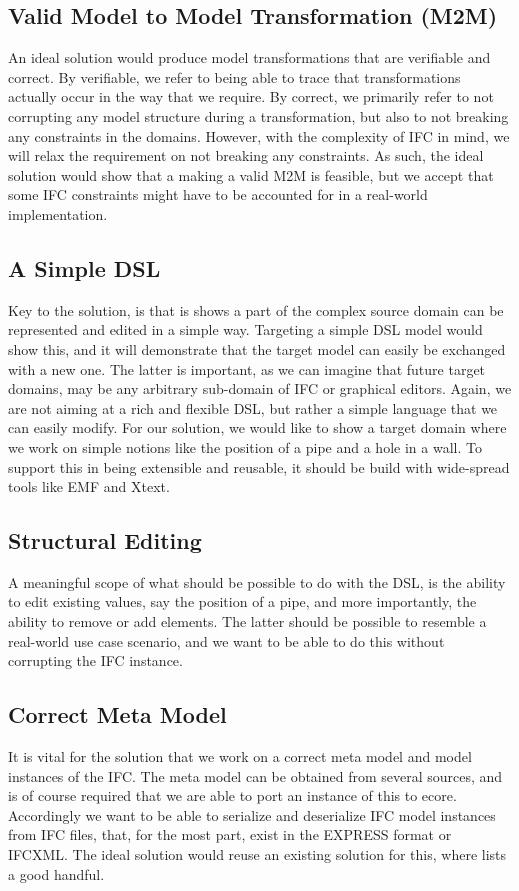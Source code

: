 \subsection{Valid Model to Model Transformation (M2M)}
An ideal solution would produce model transformations that are verifiable and correct. By verifiable, we refer to being able to trace that transformations actually occur in the way that we require. By correct, we primarily refer to not corrupting any model structure during a transformation, but also to not breaking any constraints in the domains. However, with the complexity of IFC in mind, we will relax the requirement on not breaking any constraints. As such, the ideal solution would show that a making a valid M2M is feasible, but we accept that some IFC constraints might have to be accounted for in a real-world implementation.

\subsection{A Simple DSL}
Key to the solution, is that is shows a part of the complex source domain can be represented and edited in a simple way. Targeting a simple DSL model would show this, and it will demonstrate that the target model can easily be exchanged with a new one. The latter is important, as we can imagine that future target domains, may be any arbitrary sub-domain of IFC or graphical editors. Again, we are not aiming at a rich and flexible DSL, but rather a simple language that we can easily modify. For our solution, we would like to show a target domain where we work on simple notions like the position of a pipe and a hole in a wall. To support this in being extensible and reusable, it should be build with wide-spread tools like EMF and Xtext.

\subsection{Structural Editing}
A meaningful scope of what should be possible to do with the DSL, is the ability to edit existing values, say the position of a pipe, and more importantly, the ability to remove or add elements. The latter should be possible to resemble a real-world use case scenario, and we want to be able to do this without corrupting the IFC instance.

\subsection{Correct Meta Model}
It is vital for the solution that we work on a correct meta model and model instances of the IFC. The meta model can be obtained from several sources,
and is of course required that we are able to port an instance of this to ecore. Accordingly we want to be able to serialize and deserialize IFC model instances from IFC files, that, for the most part, exist in the EXPRESS format or IFCXML. The ideal solution would reuse an existing solution for this, where\cite{ifcwiki} lists a good handful.
